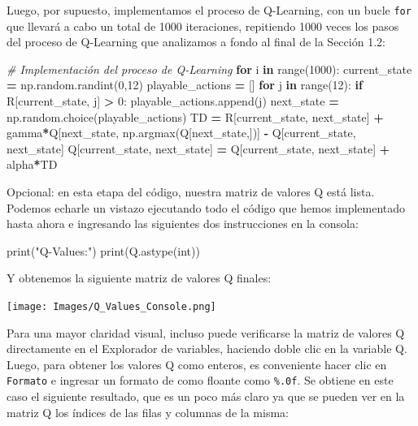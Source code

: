 \documentclass[
]{book}
\newenvironment{Shaded}{\begin{snugshade}}{\end{snugshade}}
\newcommand{\BuiltInTok}[1]{#1}
\newcommand{\CommentTok}[1]{\textcolor[rgb]{0.56,0.35,0.01}{\textit{#1}}}
\newcommand{\ControlFlowTok}[1]{\textcolor[rgb]{0.13,0.29,0.53}{\textbf{#1}}}
\newcommand{\DecValTok}[1]{\textcolor[rgb]{0.00,0.00,0.81}{#1}}
\newcommand{\KeywordTok}[1]{\textcolor[rgb]{0.13,0.29,0.53}{\textbf{#1}}}
\newcommand{\NormalTok}[1]{#1}
\newcommand{\OperatorTok}[1]{\textcolor[rgb]{0.81,0.36,0.00}{\textbf{#1}}}
\newcommand{\StringTok}[1]{\textcolor[rgb]{0.31,0.60,0.02}{#1}}
\begin{document}
Luego, por supuesto, implementamos el proceso de Q-Learning, con un bucle \texttt{for} que llevará a cabo un total de 1000 iteraciones, repitiendo 1000 veces los pasos del proceso de Q-Learning que analizamos a fondo al final de la Sección 1.2:

\begin{Shaded}
\begin{Highlighting}[]
\CommentTok{\# Implementación del proceso de Q{-}Learning}
\ControlFlowTok{for}\NormalTok{ i }\KeywordTok{in} \BuiltInTok{range}\NormalTok{(}\DecValTok{1000}\NormalTok{):}
\NormalTok{    current\_state }\OperatorTok{=}\NormalTok{ np.random.randint(}\DecValTok{0}\NormalTok{,}\DecValTok{12}\NormalTok{)}
\NormalTok{    playable\_actions }\OperatorTok{=}\NormalTok{ []}
    \ControlFlowTok{for}\NormalTok{ j }\KeywordTok{in} \BuiltInTok{range}\NormalTok{(}\DecValTok{12}\NormalTok{):}
        \ControlFlowTok{if}\NormalTok{ R[current\_state, j] }\OperatorTok{\textgreater{}} \DecValTok{0}\NormalTok{:}
\NormalTok{            playable\_actions.append(j)}
\NormalTok{    next\_state }\OperatorTok{=}\NormalTok{ np.random.choice(playable\_actions)}
\NormalTok{    TD }\OperatorTok{=}\NormalTok{ R[current\_state, next\_state] }\OperatorTok{+} 
\NormalTok{         gamma}\OperatorTok{*}\NormalTok{Q[next\_state, np.argmax(Q[next\_state,])] }\OperatorTok{{-}} 
\NormalTok{         Q[current\_state, next\_state]}
\NormalTok{    Q[current\_state, next\_state] }\OperatorTok{=}\NormalTok{ Q[current\_state, next\_state] }\OperatorTok{+}\NormalTok{ alpha}\OperatorTok{*}\NormalTok{TD}
\end{Highlighting}
\end{Shaded}

Opcional: en esta etapa del código, nuestra matriz de valores Q está lista. Podemos echarle un vistazo ejecutando todo el código que hemos implementado hasta ahora e ingresando las siguientes dos instrucciones en la consola:

\begin{Shaded}
\begin{Highlighting}[]
\BuiltInTok{print}\NormalTok{(}\StringTok{"Q{-}Values:"}\NormalTok{)}
\BuiltInTok{print}\NormalTok{(Q.astype(}\BuiltInTok{int}\NormalTok{))}
\end{Highlighting}
\end{Shaded}

Y obtenemos la siguiente matriz de valores Q finales:

\texttt{[image: Images/Q\_Values\_Console.png]}

Para una mayor claridad visual, incluso puede verificarse la matriz de valores Q directamente en el Explorador de variables, haciendo doble clic en la variable Q. Luego, para obtener los valores Q como enteros, es conveniente hacer clic en \texttt{Formato} e ingresar un formato de como floante como \texttt{\%.0f}. Se obtiene en este caso el siguiente resultado, que es un poco más claro ya que se pueden ver en la matriz Q los índices de las filas y columnas de la misma:
\end{document}
